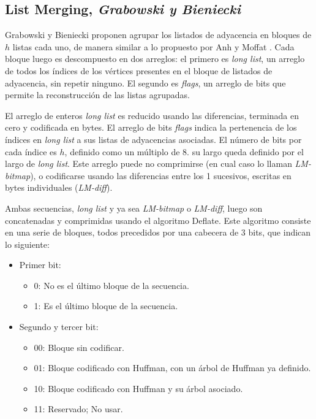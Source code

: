 
\subsection{List Merging, \textit{Grabowski y Bieniecki}}
Grabowski y Bieniecki proponen agrupar los listados de adyacencia en bloques de $h$ listas cada uno, de manera similar a lo propuesto por Anh y Moffat \cite{anh2010local}. Cada bloque luego es descompuesto en dos arreglos: el primero es \textit{long list}, un arreglo de todos los índices de los vértices presentes en el bloque de listados de adyacencia, sin repetir ninguno. El segundo es \textit{flags}, un arreglo de bits que permite la reconstrucción de las listas agrupadas. 

El arreglo de enteros \textit{long list} es reducido usando las diferencias, terminada en cero y codificada en bytes. El arreglo de bits \textit{flags} indica la pertenencia de los índices en \textit{long list} a sus listas de adyacencias asociadas. El número de bits por cada índice es $h$, definido como un múltiplo de 8. su largo queda definido por el largo de \textit{long list}. Este arreglo puede no comprimirse (en cual caso lo llaman \textit{LM-bitmap}), o codificarse usando las diferencias entre los 1 sucesivos, escritas en bytes individuales (\textit{LM-diff}).

Ambas secuencias, \textit{long list} y ya sea \textit{LM-bitmap} o \textit{LM-diff}, luego son concatenadas y comprimidas usando el algoritmo Deflate. Este algoritmo consiste en una serie de bloques, todos precedidos por una cabecera de 3 bits, que indican lo siguiente:

\begin{itemize}
	\item Primer bit:
	\begin{itemize}
		\item 0: No es el último bloque de la secuencia.
		\item 1: Es el último bloque de la secuencia.
	\end{itemize}
	\item Segundo y tercer bit:
	\begin{itemize}
		\item 00: Bloque sin codificar.
		\item 01: Bloque codificado con Huffman, con un árbol de Huffman ya definido.
		\item 10: Bloque codificado con Huffman y su árbol asociado.
		\item 11: Reservado; No usar.
	\end{itemize}
\end{itemize}

